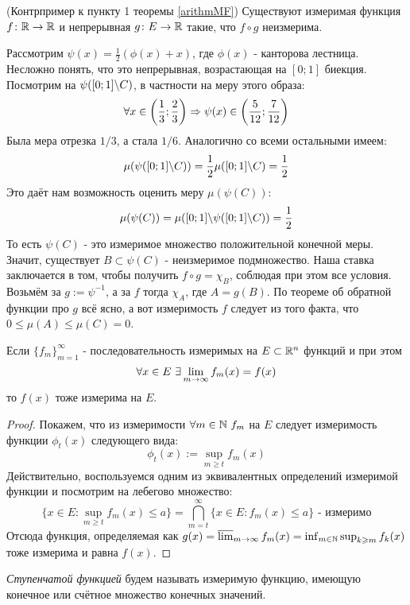 \begin{example} (Контрпример к пункту 1 теоремы \ref{arithmMF})
	Существуют измеримая функция $f \colon \mathbb{R} \to \mathbb{R}$ и непрерывная $g \colon E \to \mathbb{R}$ такие, что $f \circ g$ неизмерима.
	
	Рассмотрим $\psi(x) = \frac{1}{2}(\phi(x) + x)$, где $\phi(x)$ - канторова лестница. Несложно понять, что это непрерывная, возрастающая на $[0; 1]$ биекция. Посмотрим на $\psi([0; 1] \backslash C)$, в частности на меру этого образа:
	\[
		\forall x \in \left(\frac{1}{3}; \frac{2}{3}\right) \Rightarrow \psi(x) \in \left(\frac{5}{12}; \frac{7}{12}\right)
	\]
	Была мера отрезка $1/3$, а стала $1/6$. Аналогично со всеми остальными имеем:
	\[
		\mu(\psi([0; 1] \backslash C)) = \frac{1}{2}\mu([0; 1] \backslash C) = \frac{1}{2}
	\]
	Это даёт нам возможность оценить меру $\mu(\psi(C))$:
	\[
		\mu(\psi(C)) = \mu([0; 1] \backslash \psi([0; 1] \backslash C)) = \frac{1}{2}
	\]
	То есть $\psi(C)$ - это измеримое множество положительной конечной меры. Значит, существует $B \subset \psi(C)$ - неизмеримое подмножество. Наша ставка заключается в том, чтобы получить $f \circ g = \chi_B$, соблюдая при этом все условия. Возьмём за $g := \psi^{-1}$, а за $f$ тогда $\chi_A$, где $A = g(B)$. По теореме об обратной функции про $g$ всё ясно, а вот измеримость $f$ следует из того факта, что $0 \le \mu(A) \le \mu(C) = 0$.
\end{example}

\begin{theorem}
	Если $\{f_m\}_{m = 1}^\infty$ - последовательность измеримых на $E \subset \mathbb{R}^n$ функций и при этом
	\[
		\forall x \in E\ \exists \lim\limits_{m \to \infty} f_m(x) = f(x)
	\]
	то $f(x)$ тоже измерима на $E$.
\end{theorem}

\begin{proof}
	Покажем, что из измеримости $\forall m \in \mathbb{N}\ f_m$ на $E$ следует измеримость функции $\phi_t(x)$ следующего вида:
	\[
		\phi_t(x) := \sup_{m \ge t} f_m(x)
	\]
	Действительно, воспользуемся одним из эквивалентных определений измеримой функции и посмотрим на лебегово множество:
	\[
		\{x \in E \colon \sup_{m \ge t} f_m(x) \le a\} = \bigcap_{m = t}^\infty \{x \in E \colon f_m(x) \le a\} \text{ - измеримо}
	\]
	Отсюда функция, определяемая как $g(x) = \varlimsup_{m \to \infty} f_m(x) = \inf_{m \in \mathbb{N}} \sup_{k \geqslant m} f_k(x)$ тоже измерима и равна $f(x)$.
\end{proof}

\begin{definition}
	\textit{Ступенчатой функцией} будем называть измеримую функцию, имеющую конечное или счётное множество конечных значений.
\end{definition}

